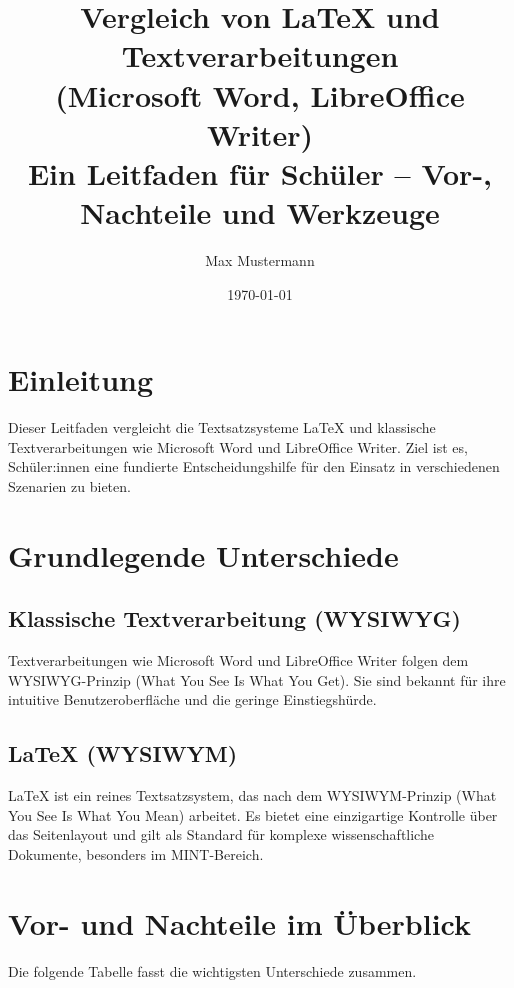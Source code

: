 \documentclass[a4paper,12pt]{article}
\title{Vergleich von \LaTeX{} und Textverarbeitungen\\ (Microsoft Word, LibreOffice Writer)\\
	\large{Ein Leitfaden für Schüler – Vor-, Nachteile und Werkzeuge}}
\author{Max Mustermann}
\date{\today}
\begin{document}
	
	\maketitle
	\tableofcontents
	\newpage
	
	\section{Einleitung}
	Dieser Leitfaden vergleicht die Textsatzsysteme \LaTeX{} und klassische Textverarbeitungen wie Microsoft Word und LibreOffice Writer. Ziel ist es, Schüler:innen eine fundierte Entscheidungshilfe für den Einsatz in verschiedenen Szenarien zu bieten.
	
	\section{Grundlegende Unterschiede}
	\label{sec:grundlagen}
	
	\subsection{Klassische Textverarbeitung (WYSIWYG)}
	Textverarbeitungen wie Microsoft Word und LibreOffice Writer folgen dem WYSIWYG-Prinzip (What You See Is What You Get). Sie sind bekannt für ihre intuitive Benutzeroberfläche und die geringe Einstiegshürde.
	
	\subsection{\LaTeX{} (WYSIWYM)}
	\LaTeX{} ist ein reines Textsatzsystem, das nach dem WYSIWYM-Prinzip (What You See Is What You Mean) arbeitet. Es bietet eine einzigartige Kontrolle über das Seitenlayout und gilt als Standard für komplexe wissenschaftliche Dokumente, besonders im MINT-Bereich.
	
	\section{Vor- und Nachteile im Überblick}
	\label{sec:vor-nachteile}
	
	Die folgende Tabelle fasst die wichtigsten Unterschiede zusammen.
	
\end{document}

